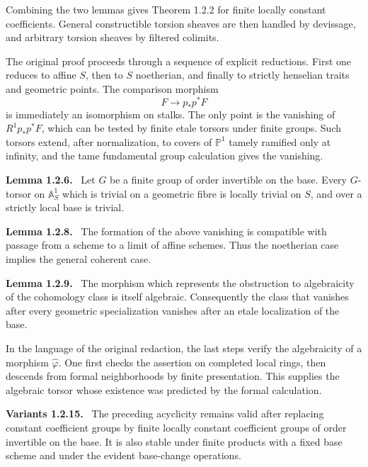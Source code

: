 \documentclass[12pt]{article}
\newenvironment{statement}[1]{\par\medskip\noindent\textbf{#1.}\ }{\par\medskip}
\newenvironment{remarktext}[1]{\par\medskip\noindent\textbf{#1.}\ }{\par\medskip}
\begin{document}
Combining the two lemmas gives Theorem 1.2.2 for finite locally constant coefficients. General constructible torsion sheaves are then handled by devissage, and arbitrary torsion sheaves by filtered colimits.

The original proof proceeds through a sequence of explicit reductions. First one reduces to affine \(S\), then to \(S\) noetherian, and finally to strictly henselian traits and geometric points. The comparison morphism
\[
F\longrightarrow p_*p^*F
\]
is immediately an isomorphism on stalks. The only point is the vanishing of \(R^1p_*p^*F\), which can be tested by finite etale torsors under finite groups. Such torsors extend, after normalization, to covers of \(\mathbb P^1\) tamely ramified only at infinity, and the tame fundamental group calculation gives the vanishing.

\begin{statement}{Lemma 1.2.6}
Let \(G\) be a finite group of order invertible on the base. Every \(G\)-torsor on \(\mathbb A^1_S\) which is trivial on a geometric fibre is locally trivial on \(S\), and over a strictly local base is trivial.
\end{statement}

\begin{statement}{Lemma 1.2.8}
The formation of the above vanishing is compatible with passage from a scheme to a limit of affine schemes. Thus the noetherian case implies the general coherent case.
\end{statement}

\begin{statement}{Lemma 1.2.9}
The morphism which represents the obstruction to algebraicity of the cohomology class is itself algebraic. Consequently the class that vanishes after every geometric specialization vanishes after an etale localization of the base.
\end{statement}

In the language of the original redaction, the last steps verify the algebraicity of a morphism \(\widehat\varphi\). One first checks the assertion on completed local rings, then descends from formal neighborhoods by finite presentation. This supplies the algebraic torsor whose existence was predicted by the formal calculation.

\begin{remarktext}{Variants 1.2.15}
The preceding acyclicity remains valid after replacing constant coefficient groups by finite locally constant coefficient groups of order invertible on the base. It is also stable under finite products with a fixed base scheme and under the evident base-change operations.
\end{remarktext}
\end{document}
